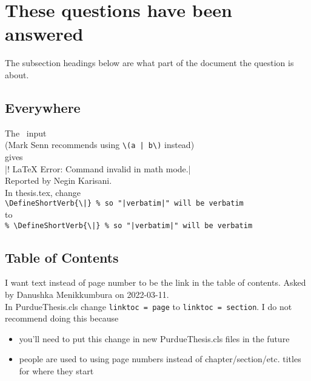 \section{These questions have been answered}

The subsection headings below are what part of the document
the question is about.


\subsection*{Everywhere}
The \LaTeXLogo\ input\\
(Mark Senn recommends using \verb+\(a | b\)+ instead)\\
gives\\
 |! LaTeX Error: Command \ttfamily invalid in math mode.|\\
Reported by Negin Karisani.\\
\MyA
In thesis.tex, change\\
 \verb+\DefineShortVerb{\|} % so "|verbatim|" will be verbatim+\\
to\\
 \verb+% \DefineShortVerb{\|} % so "|verbatim|" will be verbatim+


\subsection*{Table of Contents}

I want text instead of page number to be the link
in the table of contents.
Asked by Danushka Menikkumbura on 2022-03-11.\\
\MyA
In PurdueThesis.cls change \verb+linktoc = page+
to \verb+linktoc = section+.
I do not recommend doing this because
\begin{itemize}
  \item
    you'll need to put this change
    in new PurdueThesis.cls files in the future
  \item
    people are used to using page numbers instead
    of chapter/section/etc. titles for where they
    start
\end{itemize}
